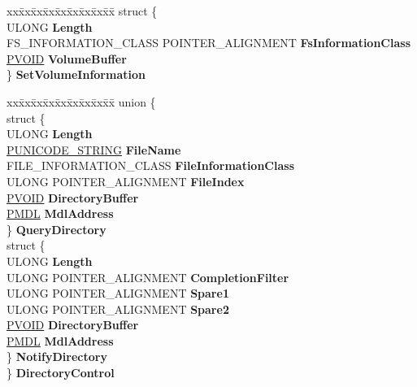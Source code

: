 \begin{DoxyCompactItemize}
\begin{tabbing}
\end{tabbing}\item 
\mbox{\label{union___f_l_t___p_a_r_a_m_e_t_e_r_s_a74f2bc201b69108da8391a22f6745352}} 
\begin{tabbing}
xx\=xx\=xx\=xx\=xx\=xx\=xx\=xx\=xx\=\kill
struct \{\\
\>ULONG {\bfseries Length}\\
\>FS\_INFORMATION\_CLASS POINTER\_ALIGNMENT {\bfseries FsInformationClass}\\
\>\hyperlink{interfacevoid}{PVOID} {\bfseries VolumeBuffer}\\
\} {\bfseries SetVolumeInformation}\\

\end{tabbing}\item 
\mbox{\label{union___f_l_t___p_a_r_a_m_e_t_e_r_s_a404ac26966ff0689302d1d749d564fd5}} 
\begin{tabbing}
xx\=xx\=xx\=xx\=xx\=xx\=xx\=xx\=xx\=\kill
union \{\\
\>struct \{\\
\>\>ULONG {\bfseries Length}\\
\>\>\hyperlink{struct___u_n_i_c_o_d_e___s_t_r_i_n_g}{PUNICODE\_STRING} {\bfseries FileName}\\
\>\>FILE\_INFORMATION\_CLASS {\bfseries FileInformationClass}\\
\>\>ULONG POINTER\_ALIGNMENT {\bfseries FileIndex}\\
\>\>\hyperlink{interfacevoid}{PVOID} {\bfseries DirectoryBuffer}\\
\>\>\hyperlink{interfacevoid}{PMDL} {\bfseries MdlAddress}\\
\>\} {\bfseries QueryDirectory}\\
\>struct \{\\
\>\>ULONG {\bfseries Length}\\
\>\>ULONG POINTER\_ALIGNMENT {\bfseries CompletionFilter}\\
\>\>ULONG POINTER\_ALIGNMENT {\bfseries Spare1}\\
\>\>ULONG POINTER\_ALIGNMENT {\bfseries Spare2}\\
\>\>\hyperlink{interfacevoid}{PVOID} {\bfseries DirectoryBuffer}\\
\>\>\hyperlink{interfacevoid}{PMDL} {\bfseries MdlAddress}\\
\>\} {\bfseries NotifyDirectory}\\
\} {\bfseries DirectoryControl}\\


\end{tabbing}
\end{DoxyCompactItemize}
